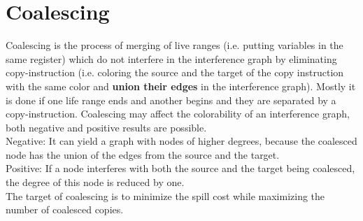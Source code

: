 \documentclass[a4paper,10pt]{article}
\begin{document}
\section{Coalescing}
Coalescing is the process of merging of live ranges (i.e. putting variables in the same register) which do not interfere in the interference graph by eliminating copy-instruction (i.e. coloring the source and the target of the copy instruction with the same color and \textbf{union their edges} in the interference graph). Mostly it is done if one life range ends and another begins and they are separated by a copy-instruction.
Coalescing may affect the colorability of an interference graph, both negative and positive results are possible.\\
Negative: It can yield a graph with nodes of higher degrees, because the coalesced node has the union of the edges from the source and the target.\\
Positive: If a node interferes with both the source and the target being coalesced, the degree of this node is reduced by one.\\
The target of coalescing is to minimize the spill cost while maximizing the number of coalesced copies.
\end{document}
